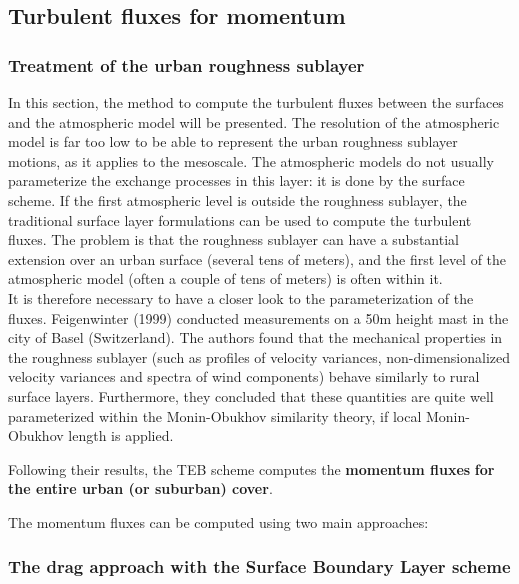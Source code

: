 \subsection{Turbulent fluxes for momentum}\label{turb}

\subsubsection{Treatment of the urban roughness sublayer}

In this section, the method to compute the turbulent
fluxes between the surfaces and the atmospheric model
will be presented. The resolution of the atmospheric model is far
too low to be able to represent the urban roughness sublayer motions,
as it applies to the mesoscale.
The atmospheric models do not usually parameterize the
exchange processes in this layer: it is done by the
surface scheme. If the first atmospheric level is  outside
the roughness sublayer, the traditional surface
layer formulations can be used to compute the turbulent fluxes.
The problem is that the roughness sublayer can have a substantial extension
over an urban surface (several tens of meters), and the
first level of the atmospheric model (often a couple of tens of meters)
is often within it.\\

It is therefore necessary to have a closer look to the parameterization
of the fluxes. Feigenwinter \etal (1999)\nocite{Feigenwinter1999} conducted measurements
on a 50m height mast in the city of Basel (Switzerland). The
authors found that the mechanical properties in the roughness sublayer
(such as profiles of velocity variances, non-dimensionalized velocity
variances and spectra of wind components) behave similarly to rural
surface layers. Furthermore, they concluded that
these quantities are quite well parameterized
within the Monin-Obukhov similarity theory, if local
Monin-Obukhov length is applied.

Following their results, the TEB scheme computes the {\bf momentum fluxes}
{\bf for the entire urban (or suburban) cover}.

The momentum fluxes can be computed using two main approaches:

\subsubsection{The drag approach with the Surface Boundary Layer scheme}

